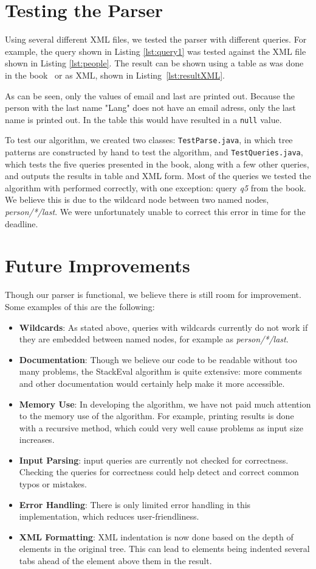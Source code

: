 \documentclass[11pt]{article}
\begin{document}
\section{Testing the Parser}
Using several different XML files, we tested the parser with different queries. For example, the query shown in Listing \ref{lst:query1} was tested against the XML file shown in Listing \ref{lst:people}. The result can be shown using a table as was done in the book~\cite{abiteboul2012web} or as XML, shown in Listing~\ref{lst:resultXML}.


As can be seen, only the values of email and last are printed out. Because the person with the last name "Lang" does not have an email adress, only the last name is printed out. In the table this would have resulted in a \lstinline{null} value. 

To test our algorithm, we created two classes: \lstinline{TestParse.java}, in which tree patterns are constructed by hand to test the algorithm, and \lstinline{TestQueries.java}, which tests the five queries presented in the book, along with a few other queries, and outputs the results in table and XML form.
Most of the queries we tested the algorithm with performed correctly, with one exception: query \emph{q5} from the book. We believe this is due to the wildcard node between two named nodes, \emph{person/*/last}. We were unfortunately unable to correct this error in time for the deadline.

\section{Future Improvements}
Though our parser is functional, we believe there is still room for improvement. Some examples of this are the following:
\begin{itemize}
\item \textbf{Wildcards}: As stated above, queries with wildcards currently do not work if they are embedded between named nodes, for example as \emph{person/*/last}.
\item \textbf{Documentation}: Though we believe our code to be readable without too many problems, the StackEval algorithm is quite extensive: more comments and other documentation would certainly help make it more accessible.
\item \textbf{Memory Use}: In developing the algorithm, we have not paid much attention to the memory use of the algorithm. For example, printing results is done with a recursive method, which could very well cause problems as input size increases.
\item \textbf{Input Parsing}: input queries are currently not checked for correctness. Checking the queries for correctness could help detect and correct common typos or mistakes.
\item \textbf{Error Handling}: There is only limited error handling in this implementation, which reduces user-friendliness.
\item \textbf{XML Formatting}: XML indentation is now done based on the depth of elements in the original tree. This can lead to elements being indented several tabs ahead of the element above them in the result.
\end{itemize}
\end{document}
